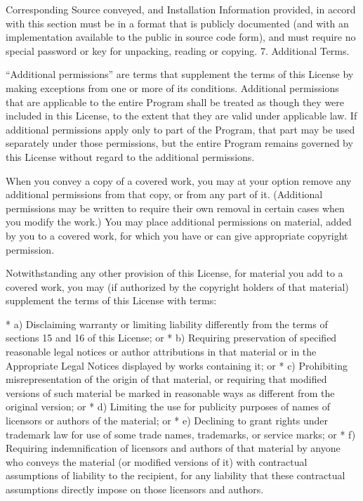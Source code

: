 {\begin{multicols}{4}
Corresponding Source conveyed, and Installation Information provided, in accord with this section must be in a format that is publicly documented (and with an implementation available to the public in source code form), and must require no special password or key for unpacking, reading or copying.
7. Additional Terms.

“Additional permissions” are terms that supplement the terms of this License by making exceptions from one or more of its conditions. Additional permissions that are applicable to the entire Program shall be treated as though they were included in this License, to the extent that they are valid under applicable law. If additional permissions apply only to part of the Program, that part may be used separately under those permissions, but the entire Program remains governed by this License without regard to the additional permissions.

When you convey a copy of a covered work, you may at your option remove any additional permissions from that copy, or from any part of it. (Additional permissions may be written to require their own removal in certain cases when you modify the work.) You may place additional permissions on material, added by you to a covered work, for which you have or can give appropriate copyright permission.

Notwithstanding any other provision of this License, for material you add to a covered work, you may (if authorized by the copyright holders of that material) supplement the terms of this License with terms:

    * a) Disclaiming warranty or limiting liability differently from the terms of sections 15 and 16 of this License; or
    * b) Requiring preservation of specified reasonable legal notices or author attributions in that material or in the Appropriate Legal Notices displayed by works containing it; or
    * c) Prohibiting misrepresentation of the origin of that material, or requiring that modified versions of such material be marked in reasonable ways as different from the original version; or
    * d) Limiting the use for publicity purposes of names of licensors or authors of the material; or
    * e) Declining to grant rights under trademark law for use of some trade names, trademarks, or service marks; or
    * f) Requiring indemnification of licensors and authors of that material by anyone who conveys the material (or modified versions of it) with contractual assumptions of liability to the recipient, for any liability that these contractual assumptions directly impose on those licensors and authors.


\end{multicols}}

